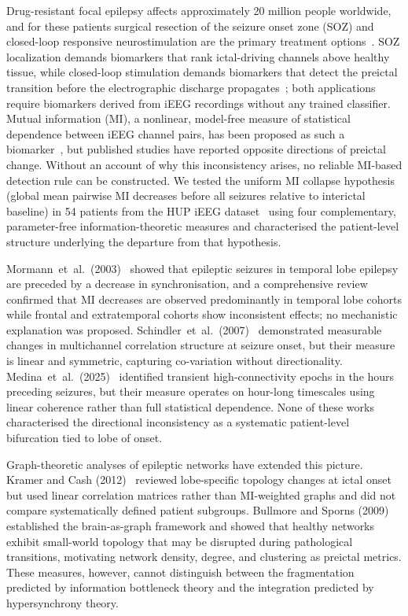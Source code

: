 \documentclass[a4paper,fleqn]{cas-dc}
\begin{document}
Drug-resistant focal epilepsy affects approximately 20 million people
worldwide, and for these patients surgical resection of the seizure
onset zone (SOZ) and closed-loop responsive neurostimulation are the
primary treatment options~\citep{kwan2000,bergey2015}.
%
SOZ localization demands biomarkers that rank ictal-driving channels
above healthy tissue, while closed-loop stimulation demands biomarkers
that detect the preictal transition before the electrographic discharge
propagates~\citep{mormann2007}; both applications require biomarkers
derived from iEEG recordings without any trained classifier.
%
Mutual information (MI), a nonlinear, model-free measure of statistical
dependence between iEEG channel pairs, has been proposed as such a
biomarker~\citep{schindler2008,kramer2012}, but published studies have
reported opposite directions of preictal change.
%
Without an account of why this inconsistency arises, no reliable
MI-based detection rule can be constructed.
%
We tested the uniform MI collapse hypothesis (global mean pairwise MI
decreases before all seizures relative to interictal baseline) in 54
patients from the HUP iEEG dataset~\citep{bernabei2023} using four
complementary, parameter-free information-theoretic measures and
characterised the patient-level structure underlying the departure from
that hypothesis.

Mormann~et~al.\ (2003)~\citep{mormann2003} showed that epileptic
seizures in temporal lobe epilepsy are preceded by a decrease in
synchronisation, and a comprehensive review~\citep{mormann2007}
confirmed that MI decreases are observed predominantly in temporal lobe
cohorts while frontal and extratemporal cohorts show inconsistent
effects; no mechanistic explanation was proposed.
%
Schindler~et~al.\ (2007)~\citep{schindler2008} demonstrated measurable
changes in multichannel correlation structure at seizure onset, but
their measure is linear and symmetric, capturing co-variation without
directionality.
%
Medina~et~al.\ (2025)~\citep{schreiber2025} identified transient
high-connectivity epochs in the hours preceding seizures, but their
measure operates on hour-long timescales using linear coherence rather
than full statistical dependence.
%
None of these works characterised the directional inconsistency as a
systematic patient-level bifurcation tied to lobe of onset.

Graph-theoretic analyses of epileptic networks have extended this
picture.
%
Kramer and Cash (2012)~\citep{kramer2012} reviewed lobe-specific
topology changes at ictal onset but used linear correlation matrices
rather than MI-weighted graphs and did not compare systematically
defined patient subgroups.
%
Bullmore and Sporns (2009)~\citep{bullmore2009} established the
brain-as-graph framework and showed that healthy networks exhibit
small-world topology that may be disrupted during pathological
transitions, motivating network density, degree, and clustering as
preictal metrics.
%
These measures, however, cannot distinguish between the fragmentation
predicted by information bottleneck theory and the integration
predicted by hypersynchrony theory.
\end{document}
